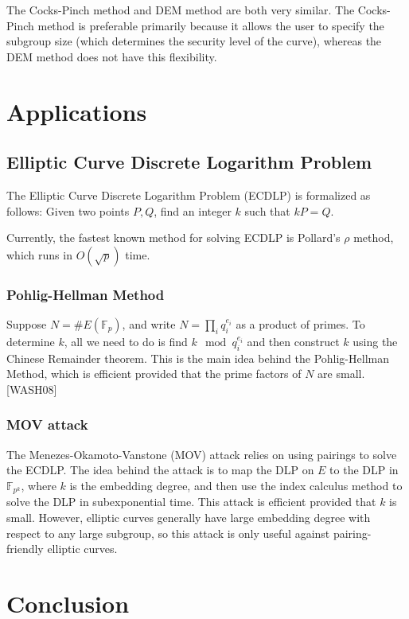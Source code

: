 \documentclass[12pt,twoside]{article}
\begin{document}
The Cocks-Pinch method and DEM method are both very similar. The Cocks-Pinch method is preferable primarily because it allows the user to specify the subgroup size (which determines the security level of the curve), whereas the DEM method does not have this flexibility. 

\section{Applications} 


\subsection{Elliptic Curve Discrete Logarithm Problem}
The Elliptic Curve Discrete Logarithm Problem (ECDLP) is formalized as follows:
Given two points $P,Q$, find an integer $k$ such that $kP = Q$.

Currently, the fastest known method for solving ECDLP is Pollard's $\rho$ method, which runs in $O(\sqrt p)$ time.

\subsubsection{Pohlig-Hellman Method}
Suppose $N = \#E(\mathbb F_p)$, and write $ N = \prod_{i}q_{i}^{e_{i}}$ as a product of primes. To determine $k$, all we need to do is find $k \mod q^{e_i}_i$ and then construct $k$ using the Chinese Remainder theorem. This is the main idea behind the Pohlig-Hellman Method, which is efficient provided that the prime factors of $N$ are small. [WASH08]




\subsubsection{MOV attack}

The Menezes-Okamoto-Vanstone (MOV) attack relies on using pairings to solve the ECDLP. The idea behind the attack is to map the DLP on $E$ to the DLP in $\mathbb F_{p^k}$, where $k$ is the embedding degree, and then use the index calculus method to solve the DLP in subexponential time. This attack is efficient provided that $k$ is small. However, elliptic curves generally have large embedding degree with respect to any large subgroup, so this attack is only useful against pairing-friendly elliptic curves.

\section{Conclusion}




 

\end{document}
